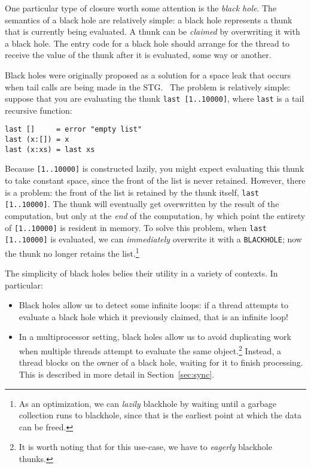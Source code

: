 One particular type of closure worth some attention is the \emph{black
hole}.  The semantics of a black hole are relatively simple: a black
hole represents a thunk that is currently being evaluated.  A thunk
can be \emph{claimed} by overwriting it with a black hole. The entry
code for a black hole should arrange for the thread to receive the value
of the thunk after it is evaluated, some way or another.

Black holes were originally proposed as a solution for a space leak that
occurs when tail calls are being made in the STG.~\cite{Jones2008} The
problem is relatively simple: suppose that you are evaluating the thunk \verb|last [1..10000]|,
where \verb|last| is a tail recursive function:

\begin{verbatim}
last []     = error "empty list"
last (x:[]) = x
last (x:xs) = last xs
\end{verbatim}

Because \verb|[1..10000]| is constructed lazily, you might expect
evaluating this thunk to take constant space, since the front of the
list is never retained.  However, there is a problem: the front of the
list is retained by the thunk itself, \verb|last [1..10000]|.  The thunk
will eventually get overwritten by the result of the computation, but
only at the \emph{end} of the computation, by which point the entirety
of \verb|[1..10000]| is resident in memory.  To solve this problem, when
\verb|last [1..10000]| is evaluated, we can \emph{immediately} overwrite
it with a \verb|BLACKHOLE|; now the thunk no longer retains the list.\footnote{As an optimization, we
can \emph{lazily} blackhole by waiting until a garbage collection runs to blackhole, since that is the
earliest point at which the data can be freed.}

The simplicity of black holes belies their utility in a variety of contexts.
In particular:

\begin{itemize}
\item Black holes allow us to detect some infinite loops: if a thread attempts
    to evaluate a black hole which it previously claimed, that is an infinite loop!
\item In a multiprocessor setting, black holes allow us to avoid duplicating work when multiple
    threads attempt to evaluate the same object.\footnote{It is worth noting that for this use-case, we have to \emph{eagerly} blackhole thunks.}  Instead, a thread blocks on the owner
    of a black hole, waiting for it to finish processing.  This is described in more
    detail in Section~\ref{sec:sync}.
\end{itemize}


